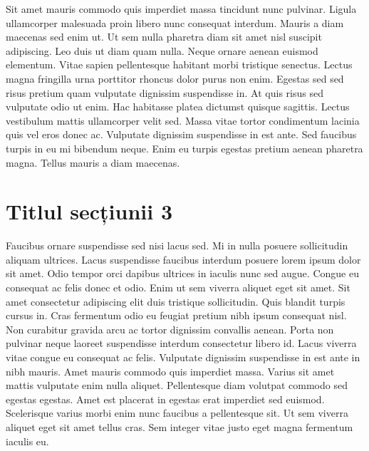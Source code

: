 Sit amet mauris commodo quis imperdiet massa tincidunt nunc pulvinar. Ligula ullamcorper malesuada proin libero nunc consequat interdum. 
Mauris a diam maecenas sed enim ut. Ut sem nulla pharetra diam sit amet nisl suscipit adipiscing. Leo duis ut diam quam nulla. Neque 
ornare aenean euismod elementum. Vitae sapien pellentesque habitant morbi tristique senectus. Lectus magna fringilla urna porttitor 
rhoncus dolor purus non enim. Egestas sed sed risus pretium quam vulputate dignissim suspendisse in. At quis risus sed vulputate odio 
ut enim. Hac habitasse platea dictumst quisque sagittis. Lectus vestibulum mattis ullamcorper velit sed. Massa vitae tortor condimentum 
lacinia quis vel eros donec ac. Vulputate dignissim suspendisse in est ante. Sed faucibus turpis in eu mi bibendum neque. Enim eu turpis 
egestas pretium aenean pharetra magna. Tellus mauris a diam maecenas.

\section{Titlul secțiunii 3}

Faucibus ornare suspendisse sed nisi lacus sed. Mi in nulla posuere sollicitudin aliquam ultrices. Lacus suspendisse faucibus interdum 
posuere lorem ipsum dolor sit amet. Odio tempor orci dapibus ultrices in iaculis nunc sed augue. Congue eu consequat ac felis donec et 
odio. Enim ut sem viverra aliquet eget sit amet. Sit amet consectetur adipiscing elit duis tristique sollicitudin. Quis blandit turpis 
cursus in. Cras fermentum odio eu feugiat pretium nibh ipsum consequat nisl. Non curabitur gravida arcu ac tortor dignissim convallis 
aenean. Porta non pulvinar neque laoreet suspendisse interdum consectetur libero id. Lacus viverra vitae congue eu consequat ac felis. 
Vulputate dignissim suspendisse in est ante in nibh mauris. Amet mauris commodo quis imperdiet massa. Varius sit amet mattis vulputate 
enim nulla aliquet. Pellentesque diam volutpat commodo sed egestas egestas. Amet est placerat in egestas erat imperdiet sed euismod. 
Scelerisque varius morbi enim nunc faucibus a pellentesque sit. Ut sem viverra aliquet eget sit amet tellus cras. Sem integer vitae justo 
eget magna fermentum iaculis eu.